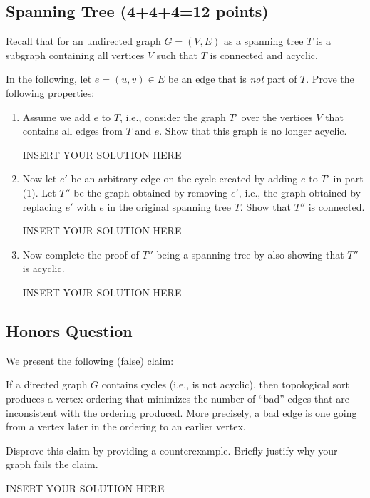 \subsection{Spanning Tree (4+4+4=12 points)}

Recall that for an undirected graph $G = (V,E)$ as a spanning tree $T$ is a subgraph containing all vertices $V$ such that $T$ is connected and acyclic. 

In the following, let $e = (u,v) \in E$ be an edge that is \emph{not} part of $T$.
Prove the following properties:

\begin{enumerate}
    \item Assume we add $e$ to $T$, i.e., consider the graph $T'$ over the vertices $V$ that contains all edges from $T$ and $e$. Show that this graph is no longer acyclic.

\begin{solution}   INSERT YOUR SOLUTION HERE   \end{solution}

    \item Now let $e'$ be an arbitrary edge on the cycle created by adding $e$ to $T'$ in part (1). Let $T''$ be the graph obtained by removing $e'$, i.e., the graph obtained by replacing $e'$ with $e$ in the original spanning tree $T$. Show that $T''$ is connected.

\begin{solution}   INSERT YOUR SOLUTION HERE   \end{solution}

    \item Now complete the proof of $T''$ being a spanning tree by also showing that $T''$ is acyclic.

\begin{solution}   INSERT YOUR SOLUTION HERE   \end{solution}
\end{enumerate}





\subsection*{Honors Question}

We present the following (false) claim:

\begin{claim}
If a directed graph $G$ contains cycles (i.e., is not acyclic), then topological sort produces a vertex ordering that minimizes the number of ``bad'' edges
that are inconsistent with the ordering produced. More precisely, a bad edge is one going from a vertex later in the ordering to an earlier vertex.
\end{claim}
\noindent Disprove this claim by providing a counterexample. Briefly justify why your graph fails the claim.
\begin{solution}   INSERT YOUR SOLUTION HERE   \end{solution}







